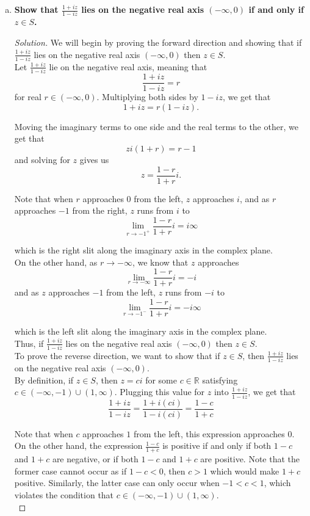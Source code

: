 \documentclass[11pt]{article}
\newenvironment{solution}
  {\renewcommand\qedsymbol{$\blacksquare$}\begin{proof}[Solution]}
  {\end{proof}}
\theoremstyle{definition}
\begin{document}
\begin{enumerate}[a)]
\item \textbf{Show that $\frac{1+iz}{1-iz}$ lies on the negative real axis $(-\infty, 0)$ if and only if $z \in S$.}

\begin{solution}

We will begin by proving the forward direction and showing that if $\frac{1+iz}{1-iz}$ lies on the negative real axis $(-\infty, 0)$ then $z \in S$. \\

Let $\frac{1+iz}{1-iz}$ lie on the negative real axis, meaning that \[ \frac{1+iz}{1-iz} = r \] for real $r \in (-\infty, 0).$ Multiplying both sides by $1-iz$, we get that
\[ 1+iz = r(1-iz).\]

Moving the imaginary terms to one side and the real terms to the other, we get that \[zi(1+r) = r-1\] and solving for $z$ gives us
\[ z = \frac{1-r}{1+r}i. \]

Note that when $r$ approaches $0$ from the left, $z$ approaches $i$, and as $r$ approaches $-1$ from the right, $z$ runs from $i$ to \[\lim\limits_{r \rightarrow -1^{+}} \frac{1-r}{1+r}i = i\infty\]

which is the right slit along the imaginary axis in the complex plane. \\

On the other hand, as $r \rightarrow -\infty$, we know that $z$ approaches \[ \lim\limits_{r \rightarrow -\infty} \frac{1-r}{1+r}i = -i\] and as $z$ approaches $-1$ from the left, $z$ runs from $-i$ to
\[ \lim\limits_{r \rightarrow -1^{-}} \frac{1-r}{1+r}i = -i\infty\]

which is the left slit along the imaginary axis in the complex plane. \\

Thus, if $\frac{1+iz}{1-iz}$ lies on the negative real axis $(-\infty, 0)$ then $z \in S$. \\


To prove the reverse direction, we want to show that if $z \in S$, then $\frac{1+iz}{1-iz}$ lies on the negative real axis $(-\infty, 0).$ \\

By definition, if $z \in S$, then $z=ci$ for some $c \in \mathbb{R}$ satisfying $c \in (-\infty, -1) \cup (1, \infty).$ Plugging this value for $z$ into $\frac{1+iz}{1-iz}$, we get that
\[ \frac{1+iz}{1-iz} = \frac{1+i(ci)}{1-i(ci)} = \frac{1-c}{1+c}\]


Note that when $c$ approaches $1$ from the left, this expression approaches $0$. On the other hand, the expression $\frac{1-c}{1+c}$ is positive if and only if both $1-c$ and $1+c$ are negative,
or if both $1-c$ and $1+c$ are positive. Note that the former case cannot occur as if $1-c < 0$, then $c>1$ which would make $1+c$ positive. Similarly, the latter case can only occur when $-1 < c < 1$, which violates
the condition that $c \in (-\infty, -1) \cup (1, \infty).$ \\


\end{solution}
\end{enumerate}
\end{document}
